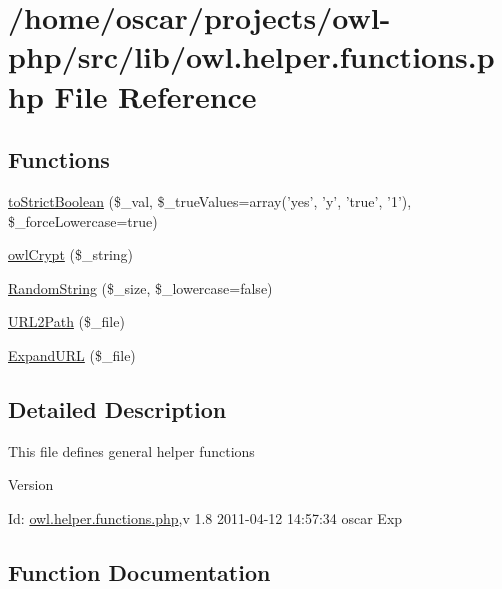 \section{/home/oscar/projects/owl-\/php/src/lib/owl.helper.functions.php File Reference}
\label{owl_8helper_8functions_8php}
\subsection*{Functions}
\begin{DoxyCompactItemize}
\item 
\hyperlink{owl_8helper_8functions_8php_a2c49978306cd0e2f4f9406c20373ed02}{toStrictBoolean} (\$\_\-val, \$\_\-trueValues=array('yes', 'y', 'true', '1'), \$\_\-forceLowercase=true)
\item 
\hyperlink{owl_8helper_8functions_8php_a0836b830fe9e399265d4cf910c5dff28}{owlCrypt} (\$\_\-string)
\item 
\hyperlink{owl_8helper_8functions_8php_a91f5481c5ca87b74848c1966639d490c}{RandomString} (\$\_\-size, \$\_\-lowercase=false)
\item 
\hyperlink{owl_8helper_8functions_8php_a0eb759657249228d1a2473ffa7de921c}{URL2Path} (\$\_\-file)
\item 
\hyperlink{owl_8helper_8functions_8php_a08f49d79aaaa581551e49017424cbe77}{ExpandURL} (\$\_\-file)
\end{DoxyCompactItemize}


\subsection{Detailed Description}
This file defines general helper functions \begin{DoxyVersion}{Version}

\end{DoxyVersion}
\begin{DoxyParagraph}{Id:}
\hyperlink{owl_8helper_8functions_8php}{owl.helper.functions.php},v 1.8 2011-\/04-\/12 14:57:34 oscar Exp 
\end{DoxyParagraph}


\subsection{Function Documentation}
